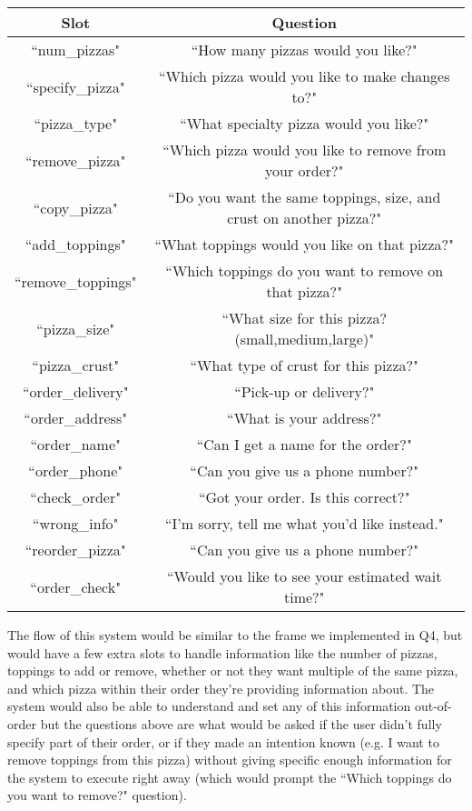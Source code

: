 \documentclass{article}
\begin{document}
\begin{tabular}{|c|c|}
\hline
Slot & Question \\\hline
``num\_pizzas" & ``How many pizzas would you like?"\\\hline
``specify\_pizza" & ``Which pizza would you like to make changes to?"\\\hline
``pizza\_type" & ``What specialty pizza would you like?"\\\hline
``remove\_pizza" & ``Which pizza would you like to remove from your order?"\\\hline
``copy\_pizza" & ``Do you want the same toppings, size, and crust on another pizza?"\\\hline
``add\_toppings" & ``What toppings would you like on that pizza?"\\\hline
``remove\_toppings" & ``Which toppings do you want to remove on that pizza?"\\\hline
``pizza\_size" & ``What size for this pizza? (small,medium,large)"\\\hline
``pizza\_crust" & ``What type of crust for this pizza?"\\\hline
``order\_delivery" & ``Pick-up or delivery?"\\\hline
``order\_address" & ``What is your address?"\\\hline
``order\_name" & ``Can I get a name for the order?"\\\hline
``order\_phone" & ``Can you give us a phone number?"\\\hline
``check\_order" & ``Got your order. Is this correct?"\\\hline
``wrong\_info" & ``I'm sorry, tell me what you'd like instead."\\\hline
``reorder\_pizza" & ``Can you give us a phone number?"\\\hline
``order\_check" & ``Would you like to see your estimated wait time?"\\\hline
\end{tabular}

\vspace{.5cm}

The flow of this system would be similar to the frame we implemented in Q4, but would have a few extra slots to handle information like the number of pizzas, toppings to add or remove, whether or not they want multiple of the same pizza, and which pizza within their order they're providing information about. The system would also be able to understand and set any of this information out-of-order but the questions above are what would be asked if the user didn't fully specify part of their order, or if they made an intention known (e.g. I want to remove toppings from this pizza) without giving specific enough information for the system to execute right away (which would prompt the ``Which toppings do you want to remove?" question). 
\end{document}
